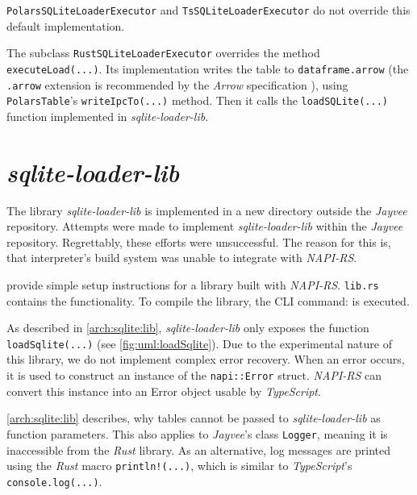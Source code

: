 \Verb|PolarsSQLiteLoaderExecutor| and \Verb|TsSQLiteLoaderExecutor| do not override this default implementation.

\begin{minipage}{\linewidth}
	The subclass \Verb|RustSQLiteLoaderExecutor| overrides the method \Verb|executeLoad(...)|.
	Its implementation writes the table to \Verb|dataframe.arrow| (the \Verb|.arrow| extension is recommended by the \emph{Arrow} specification \autocite{arrow:spec}), using \Verb|PolarsTable|'s \Verb|writeIpcTo(...)| method.
	Then it calls the \Verb|loadSQLite(...)| function implemented in \emph{sqlite-loader-lib}.
\end{minipage}


\section{\emph{sqlite-loader-lib}}
\label{subsection:sqlite-loader-lib}
The library \emph{sqlite-loader-lib} is implemented in a new directory outside the \emph{Jayvee} repository.
Attempts were made to implement \emph{sqlite-loader-lib} within the \emph{Jayvee} repository.
Regrettably, these efforts were unsuccessful.
The reason for this is, that interpreter's build system was unable to integrate with \emph{NAPI-RS}.

\textcite{napi:template} provide simple setup instructions for a library built with \emph{NAPI-RS}.
\Verb|lib.rs| contains the functionality.
To compile the library, the \ac{CLI} command:
is executed.

As described in \autoref{arch:sqlite:lib}, \emph{sqlite-loader-lib} only exposes the function \Verb|loadSqlite(...)| (see \ref{fig:uml:loadSqlite}).
Due to the experimental nature of this library, we do not implement complex error recovery.
When an error occurs, it is used to construct an instance of the \Verb|napi::Error| struct.
\emph{NAPI-RS} can convert this instance into an Error object usable by \emph{TypeScript}.

\autoref{arch:sqlite:lib} describes, why tables cannot be passed to \emph{sqlite-loader-lib} as function parameters.
This also applies to \emph{Jayvee}'s class \Verb|Logger|, meaning it is inaccessible from the \emph{Rust} library.
As an alternative, log messages are printed using the \emph{Rust} macro \Verb|println!(...)|, which is similar to \emph{TypeScript}'s \Verb|console.log(...)|.


